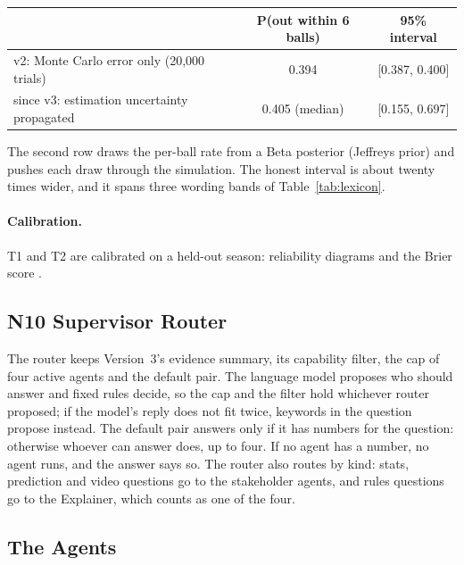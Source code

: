 \documentclass[11pt,a4paper]{article}
\begin{document}
\begin{center}
\small
\begin{tabular}{@{}lcc@{}}
\toprule
& \textbf{P(out within 6 balls)} & \textbf{95\% interval} \\
\midrule
v2: Monte Carlo error only (20,000 trials) & 0.394 & [0.387, 0.400] \\
since v3: estimation uncertainty propagated & 0.405 (median) & [0.155, 0.697] \\
\bottomrule
\end{tabular}
\end{center}

\noindent The second row draws the per-ball rate from a Beta posterior (Jeffreys
prior) and pushes each draw through the simulation. The honest interval is about
twenty times wider, and it spans three wording bands of Table~\ref{tab:lexicon}.

\paragraph{Calibration.} T1 and T2 are calibrated on a held-out season:
reliability diagrams and the Brier score \cite{brier}.

\subsection{N10 Supervisor Router}

The router keeps Version~3's evidence summary, its capability filter, the cap of
four active agents and the default pair. The language model proposes who should
answer and fixed rules decide, so the cap and the filter hold whichever router
proposed; if the model's reply does not fit twice, keywords in the question
propose instead. The default pair answers only if it has numbers for the question:
otherwise whoever can answer does, up to four. If no agent has a number, no agent
runs, and the answer says so. The router also routes by kind: stats, prediction
and video questions go to the stakeholder agents, and rules questions go to the
Explainer, which counts as one of the four.

\subsection{The Agents}
\end{document}
